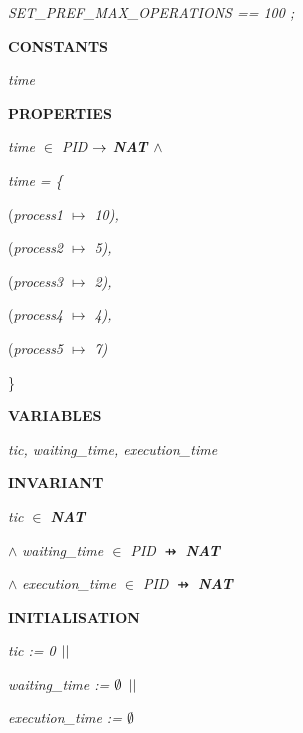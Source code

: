 \documentclass[11pt]{article}
\begin{document}
\begin{sloppypar}
\hspace*{0.20in}\it SET\_PREF\_MAX\_OPERATIONS \rm == \rm 1\rm 0\rm 0 \rm ;

\bf CONSTANTS

\hspace*{0.20in}\it time 

\bf PROPERTIES

\hspace*{0.20in}\it time  $\in$  \it PID  $\rightarrow$  \bf NAT  $\land$  

\hspace*{0.20in}\it time \rm = \rm \{

\hspace*{0.40in}\rm (\it process1  $\mapsto$  \rm 1\rm 0\rm )\rm ,

\hspace*{0.40in}\rm (\it process2  $\mapsto$  \rm 5\rm )\rm ,

\hspace*{0.40in}\rm (\it process3  $\mapsto$  \rm 2\rm )\rm ,

\hspace*{0.40in}\rm (\it process4  $\mapsto$  \rm 4\rm )\rm ,

\hspace*{0.40in}\rm (\it process5  $\mapsto$  \rm 7\rm )

\hspace*{0.20in}\rm \}

\bf VARIABLES

\hspace*{0.20in}\it tic\rm , \it waiting\_time\rm , \it execution\_time

\bf INVARIANT\hspace*{0.15in}

\hspace*{0.20in}\it tic  $\in$  \bf NAT

\hspace*{0.20in} $\land$  \it waiting\_time  $\in$  \it PID  $\pfun$  \bf NAT

\hspace*{0.20in} $\land$  \it execution\_time  $\in$  \it PID  $\pfun$  \bf NAT

\bf INITIALISATION

\hspace*{0.20in}\it tic \rm := \rm 0  $\mbox{$\mid\mid$}$ 

\hspace*{0.20in}\it waiting\_time \rm :=  $\emptyset$   $\mbox{$\mid\mid$}$ 

\hspace*{0.20in}\it execution\_time \rm :=  $\emptyset$ 


\end{sloppypar}
\end{document}
